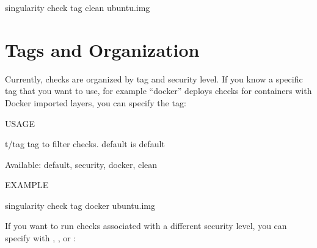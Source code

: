 \documentclass[letterpaper,10pt,english]{sphinxmanual}
\begin{document}
%
\begin{sphinxVerbatim}[commandchars=\\\{\}]
\PYGZdl{} singularity check \PYGZhy{}\PYGZhy{}tag clean ubuntu.img
\end{sphinxVerbatim}


\section{Tags and Organization}
\label{\detokenize{container_checks:tags-and-organization}}
Currently, checks are organized by tag and security level. If you know a
specific tag that you want to use, for example “docker” deploys checks
for containers with Docker imported layers, you can specify the tag:

%
\begin{sphinxVerbatim}[commandchars=\\\{\}]
USAGE

    \PYGZhy{}t/\PYGZhy{}\PYGZhy{}tag       tag to filter checks. default is \PYGZdq{}default\PYGZdq{}

                      Available: default, security, docker, clean


EXAMPLE

\PYGZdl{} singularity check \PYGZhy{}\PYGZhy{}tag docker ubuntu.img
\end{sphinxVerbatim}

If you want to run checks associated with a different security level,
you can specify with  ,  , or  :

%
\begin{sphinxVerbatim}[commandchars=\\\{\}]
  \PYG{p}{[}\PYG{p}{]}  \PYG{p}{[} \PYG{p}{]}  

        

     


                

               

               
\end{sphinxVerbatim}
\end{document}
